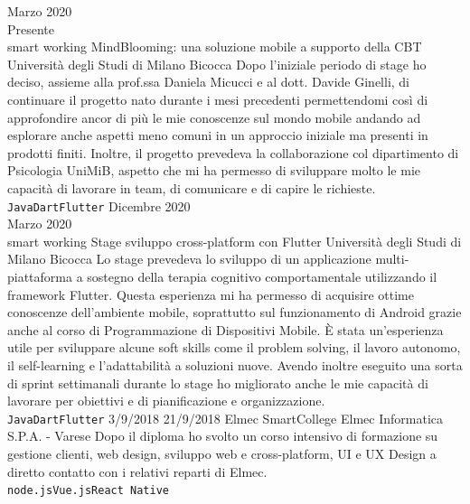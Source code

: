 \documentclass[9pt]{developercv}
\begin{document}
\vspace{0.5cm}




\begin{entrylist}
	\entry
		{Marzo 2020 \\ Presente \\\footnotesize{smart working}}
		{MindBlooming: una soluzione mobile a supporto della CBT}
		{Università degli Studi di Milano Bicocca}
		{Dopo l'iniziale periodo di stage ho deciso, assieme alla prof.ssa Daniela Micucci e al dott. Davide Ginelli, di continuare il progetto nato durante i mesi precedenti permettendomi così di approfondire ancor di più le mie conoscenze sul mondo mobile andando ad esplorare anche aspetti meno comuni in un approccio iniziale ma presenti in prodotti finiti. Inoltre, il progetto prevedeva la collaborazione col dipartimento di Psicologia UniMiB, aspetto che mi ha permesso di sviluppare molto le mie capacità di lavorare in team, di comunicare e di capire le richieste. \\ \texttt{Java}\slashsep\texttt{Dart}\slashsep\texttt{Flutter}}
	\entry
		{Dicembre 2020 \\ Marzo 2020\\\footnotesize{smart working}}
		{Stage sviluppo cross-platform con Flutter}
		{Università degli Studi di Milano Bicocca}
		{Lo stage prevedeva lo sviluppo di un applicazione multi-piattaforma a sostegno della terapia cognitivo comportamentale utilizzando il framework Flutter. Questa esperienza mi ha permesso di acquisire ottime conoscenze dell'ambiente mobile, soprattutto sul funzionamento di Android grazie anche al corso di Programmazione di Dispositivi Mobile. È stata un'esperienza utile per sviluppare alcune soft skills come il problem solving, il lavoro autonomo, il self-learning e l'adattabilità a soluzioni nuove. Avendo inoltre eseguito una sorta di sprint settimanali durante lo stage ho migliorato anche le mie capacità di lavorare per obiettivi e di pianificazione e organizzazione.  \\ \texttt{Java}\slashsep\texttt{Dart}\slashsep\texttt{Flutter}}
	\entry
		{3/9/2018  21/9/2018}
		{Elmec SmartCollege}
		{Elmec Informatica S.P.A. - Varese}
		{Dopo il diploma ho svolto un corso intensivo di formazione su gestione clienti, web design, sviluppo web e cross-platform, UI e UX Design a diretto contatto con i relativi reparti di Elmec. \\ \texttt{node.js}\slashsep\texttt{Vue.js}\slashsep\texttt{React Native}}

\end{entrylist}
\end{document}
